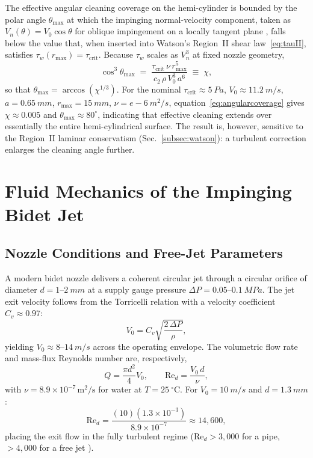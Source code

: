 \documentclass[10pt,letterpaper]{article}
\newcommand{\Rey}{\mathrm{Re}}
\begin{document}
The effective angular cleaning coverage on the hemi-cylinder is bounded
by the polar angle $\theta_\mathrm{max}$ at which the impinging
normal-velocity component, taken as $V_n(\theta) = V_0 \cos\theta$ for
oblique impingement on a locally tangent plane
\citep{BeitelmalEtAl2000}, falls below the value that, when inserted
into Watson's Region~II shear law~\eqref{eq:tauII}, satisfies
$\tau_w(r_\mathrm{max}) = \tau_\mathrm{crit}$. Because $\tau_w$ scales as
$V_n^3$ at fixed nozzle geometry,
\begin{equation}
    \cos^3\theta_\mathrm{max}
    \;=\; \frac{\tau_\mathrm{crit}\,\nu\,r_\mathrm{max}^5}
              {c_2\,\rho\,V_0^3\,a^6}\;\equiv\;\chi,
    \label{eq:angularcoverage}
\end{equation}
so that $\theta_\mathrm{max} = \arccos(\chi^{1/3})$. For the nominal
$\tau_\mathrm{crit} \approx 5~Pa$, $V_0 \approx 11.2~m/s$,
$a = 0.65~mm$, $r_\mathrm{max} = 15~mm$, $\nu = e-6~m^2/s$,
equation~\eqref{eq:angularcoverage} gives $\chi \approx 0.005$ and
$\theta_\mathrm{max} \approx 80^\circ$, indicating that effective
cleaning extends over essentially the entire hemi-cylindrical
surface. The result is, however, sensitive to the Region~II
laminar conservatism (Sec.~\ref{subsec:watson}): a turbulent
correction enlarges the cleaning angle further.

\section{Fluid Mechanics of the Impinging Bidet Jet}
\label{sec:fluid}

\subsection{Nozzle Conditions and Free-Jet Parameters}
\label{subsec:nozzle}

A modern bidet nozzle delivers a coherent circular jet through a circular
orifice of diameter $d = 1$--$2~mm$ at a supply gauge pressure
$\Delta P = 0.05$--$0.1~MPa$. The jet exit velocity follows from the
Torricelli relation with a velocity coefficient $C_v \approx 0.97$:
\begin{equation}
    V_0 = C_v \sqrt{\frac{2\,\Delta P}{\rho}},
    \label{eq:torricelli}
\end{equation}
yielding $V_0 \approx 8$--$14~m/s$ across the operating envelope.
The volumetric flow rate and mass-flux Reynolds number are, respectively,
\begin{equation}
    Q = \frac{\pi d^2}{4} V_0, \qquad
    \Rey_d = \frac{V_0\,d}{\nu},
    \label{eq:reynolds}
\end{equation}
with $\nu = 8.9 \times 10^{-7}\,\mathrm{m^2/s}$ for water at
$T = 25~^\circ\mathrm{C}$. For $V_0 = 10~m/s$ and $d = 1.3~mm$:
\begin{equation}
    \Rey_d = \frac{(10)(1.3 \times 10^{-3})}{8.9 \times 10^{-7}}
    \approx 14{,}600,
\end{equation}
placing the exit flow in the fully turbulent regime ($\Rey_d > 3{,}000$
for a pipe, $>4{,}000$ for a free jet \citep{ZuckermanLior2006}).
\end{document}
